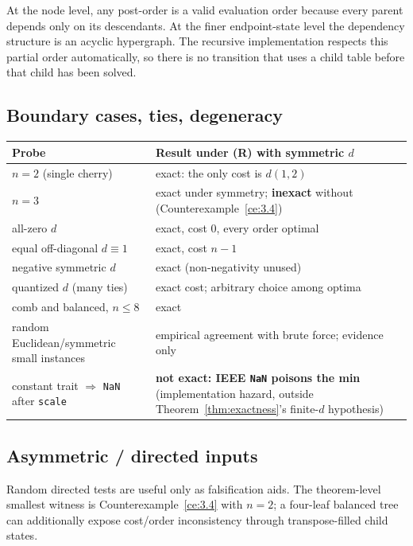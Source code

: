 \documentclass[11pt]{article}
\theoremstyle{plain}
\begin{document}
At the node level, any post-order is a valid evaluation order because every
parent depends only on its descendants. At the finer endpoint-state level the
dependency structure is an acyclic hypergraph. The recursive implementation
respects this partial order automatically, so there is no transition that uses
a child table before that child has been solved.

\subsection{Boundary cases, ties, degeneracy}

\begin{center}
\renewcommand{\arraystretch}{1.4}
\begin{tabular}{@{}l p{10.5cm}@{}}
\toprule
Probe & Result under (R) with symmetric \(d\) \\
\midrule
\(n=2\) (single cherry) & exact: the only cost is \(d(1,2)\) \\
\(n=3\) & exact under symmetry; \textbf{inexact} without
(Counterexample~\ref{ce:3.4}) \\
all-zero \(d\) & exact, cost \(0\), every order optimal \\
equal off-diagonal \(d \equiv 1\) & exact, cost \(n-1\) \\
negative symmetric \(d\) & exact (non-negativity unused) \\
quantized \(d\) (many ties) & exact cost; arbitrary choice among optima \\
comb and balanced, \(n \le 8\) & exact \\
random Euclidean/symmetric small instances & empirical agreement with brute
force; evidence only \\
constant trait \(\Rightarrow\) \texttt{NaN} after \texttt{scale} & \textbf{not
exact: IEEE \texttt{NaN} poisons the min} (implementation hazard, outside
Theorem~\ref{thm:exactness}'s finite-\(d\) hypothesis) \\
\bottomrule
\end{tabular}
\end{center}

\subsection{Asymmetric / directed inputs}

Random directed tests are useful only as falsification aids. The theorem-level
smallest witness is Counterexample~\ref{ce:3.4} with \(n=2\); a four-leaf
balanced tree can additionally expose cost/order inconsistency through
transpose-filled child states.
\end{document}
